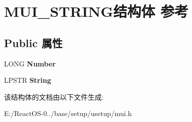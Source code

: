 \hypertarget{struct_m_u_i___s_t_r_i_n_g}{}\section{M\+U\+I\+\_\+\+S\+T\+R\+I\+N\+G结构体 参考}
\label{struct_m_u_i___s_t_r_i_n_g}
\subsection*{Public 属性}
\begin{DoxyCompactItemize}
\item 
\mbox{\label{struct_m_u_i___s_t_r_i_n_g_a98908ff77231d6f02840ff3640b34edc}} 
L\+O\+NG {\bfseries Number}
\item 
\mbox{\label{struct_m_u_i___s_t_r_i_n_g_a52fa048dcb3b409ea82eb2eb2af6fb77}} 
L\+P\+S\+TR {\bfseries String}
\end{DoxyCompactItemize}


该结构体的文档由以下文件生成\+:\begin{DoxyCompactItemize}
\item 
E\+:/\+React\+O\+S-\/0../base/setup/usetup/mui.\+h\end{DoxyCompactItemize}
